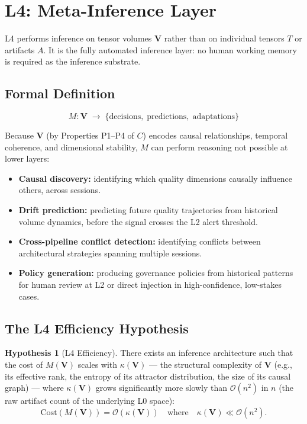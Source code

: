 \documentclass[11pt]{article}
\theoremstyle{definition}
\newtheorem{hypothesis}{Hypothesis}
\theoremstyle{remark}
\begin{document}
\section{L4: Meta-Inference Layer}

L4 performs inference on tensor volumes $\mathbf{V}$ rather than on
individual tensors $T$ or artifacts $A$. It is the fully automated
inference layer: no human working memory is required as the inference
substrate.

\subsection{Formal Definition}

\[
  M: \mathbf{V} \;\to\; \{\text{decisions},\;
  \text{predictions},\; \text{adaptations}\}
\]

Because $\mathbf{V}$ (by Properties P1--P4 of $C$) encodes causal
relationships, temporal coherence, and dimensional stability, $M$
can perform reasoning not possible at lower layers:

\begin{itemize}[leftmargin=1.5em]
  \item \textbf{Causal discovery:} identifying which quality
    dimensions causally influence others, across sessions.
  \item \textbf{Drift prediction:} predicting future quality
    trajectories from historical volume dynamics, before the signal
    crosses the L2 alert threshold.
  \item \textbf{Cross-pipeline conflict detection:} identifying
    conflicts between architectural strategies spanning multiple
    sessions.
  \item \textbf{Policy generation:} producing governance policies
    from historical patterns for human review at L2 or direct
    injection in high-confidence, low-stakes cases.
\end{itemize}

\subsection{The L4 Efficiency Hypothesis}

\begin{hypothesis}[L4 Efficiency]
There exists an inference architecture such that the cost of
$M(\mathbf{V})$ scales with $\kappa(\mathbf{V})$ --- the structural
complexity of $\mathbf{V}$ (e.g., its effective rank, the entropy
of its attractor distribution, the size of its causal graph) ---
where $\kappa(\mathbf{V})$ grows significantly more slowly than
$\mathcal{O}(n^2)$ in $n$ (the raw artifact count of the underlying
L0 space):
\[
  \text{Cost}(M(\mathbf{V})) = \mathcal{O}(\kappa(\mathbf{V}))
  \quad\text{where}\quad
  \kappa(\mathbf{V}) \ll \mathcal{O}(n^2).
\]
\end{hypothesis}
\end{document}
